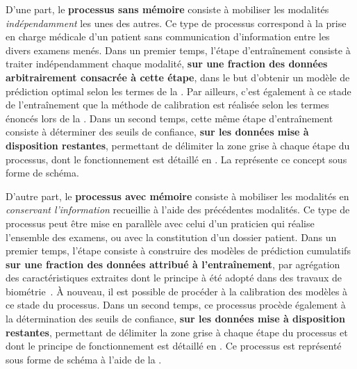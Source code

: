 D'une part, le \textbf{processus sans mémoire} consiste à mobiliser les modalités \textit{indépendamment} les unes des autres. Ce type de processus correspond à la prise en charge médicale d'un patient sans communication d'information entre les divers examens menés. Dans un premier temps, l'étape d'entraînement consiste à traiter indépendamment chaque modalité, \textbf{sur une fraction des données arbitrairement consacrée à cette étape}, dans le but d'obtenir un modèle de prédiction optimal selon les termes de la . Par ailleurs, c'est également à ce stade de l'entraînement que la méthode de calibration est réalisée selon les termes énoncés lors de la . Dans un second temps, cette même étape d'entraînement consiste à déterminer des seuils de confiance, \textbf{sur les données mise à disposition restantes}, permettant de délimiter la zone grise à chaque étape du processus, dont le fonctionnement est détaillé en . La  représente ce concept sous forme de schéma.\par

D'autre part, le \textbf{processus avec mémoire} consiste à mobiliser les modalités en \textit{conservant l'information} recueillie à l'aide des précédentes modalités. Ce type de processus peut être mise en parallèle avec celui d'un praticien qui réalise l'ensemble des examens, ou avec la constitution d'un dossier patient. Dans un premier temps, l'étape consiste à construire des modèles de prédiction cumulatifs \textbf{sur une fraction des données attribué à l'entraînement}, par agrégation des caractéristiques extraites dont le principe à été adopté dans des travaux de biométrie~\cite{Krishneswari2012}. À nouveau, il est possible de procéder à la calibration des modèles à ce stade du processus. Dans un second temps, ce processus procède également à la détermination des seuils de confiance, \textbf{sur les données mise à disposition restantes}, permettant de délimiter la zone grise à chaque étape du processus et dont le principe de fonctionnement est détaillé en . Ce processus est représenté sous forme de schéma à l'aide de la .\par

